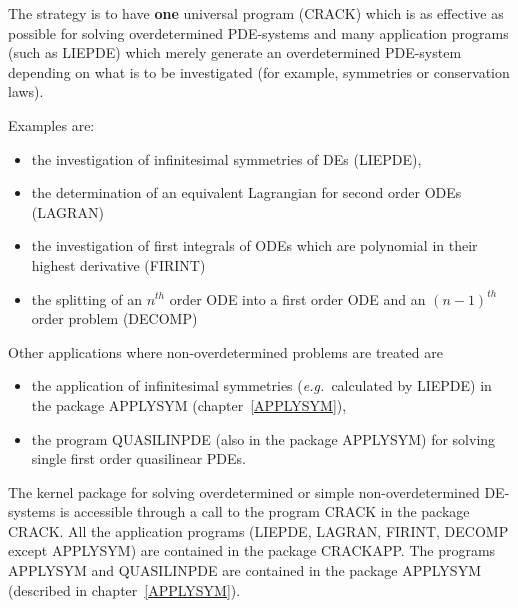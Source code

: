The strategy is to have {\bf one} universal program (CRACK) which 
is as effective as possible for solving overdetermined PDE-systems 
and many application programs (such as LIEPDE) which merely generate an 
overdetermined PDE-system depending on what is to be investigated 
(for example, symmetries or conservation laws).

Examples are:
\begin{itemize}
\item the investigation of infinitesimal symmetries of DEs (LIEPDE),
\item the determination of an equivalent Lagrangian for second order 
      ODEs (LAGRAN)
\item the investigation of first integrals of ODEs which are polynomial
      in their highest derivative (FIRINT)
\item the splitting of an $n^{th}$ order ODE into a first order ODE and
      an $(n-1)^{th}$ order problem (DECOMP)
\end{itemize}
Other applications where non-overdetermined problems are treated are
\begin{itemize}
\item the application of infinitesimal symmetries ({\em e.g.\
      }calculated by LIEPDE) in the package APPLYSYM (chapter~\ref{APPLYSYM}),
\item the program QUASILINPDE (also in the package APPLYSYM) 
      for solving single first order quasilinear PDEs.
\end{itemize}
The kernel package for solving overdetermined or simple non-overdetermined
DE-systems is accessible through a call to the program CRACK
in the package CRACK.  All the application programs (LIEPDE, LAGRAN,
FIRINT, DECOMP except APPLYSYM) are contained in the package CRACKAPP.
The programs APPLYSYM and QUASILINPDE are contained in the package
APPLYSYM (described in chapter~\ref{APPLYSYM}).


